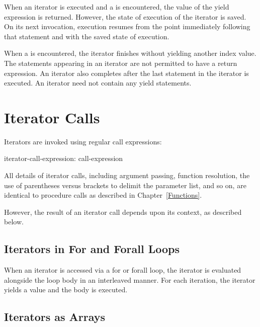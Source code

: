 When an iterator is executed and a  is encountered, the value of the yield
expression is returned.  However, the state of execution of the iterator is
saved.  On its next invocation, execution resumes from the point immediately
following that  statement and with the saved state of execution.

When a  is encountered, the iterator finishes without yielding another
index value.  The  statements appearing in an iterator are not
permitted to have a return expression.
An iterator also completes after the last
statement in the iterator is executed.
An iterator need not contain any yield statements.

\section{Iterator Calls}
\label{Iterator_Calls}

Iterators are invoked using regular call expressions:
\begin{syntax}
iterator-call-expression:
  call-expression
\end{syntax}

All details of iterator calls, including argument passing, function
resolution, the use of parentheses versus brackets to delimit the parameter
list, and so on,
are identical to procedure calls as described in Chapter~\ref{Functions}.

However, the result of an iterator call depends upon its context, as described below.

\subsection{Iterators in For and Forall Loops}
\label{Iterators_in_For_and_Forall_Loops}

When an iterator is accessed via a for or forall loop, the iterator is
evaluated alongside the loop body in an interleaved manner.  For each
iteration, the iterator yields a value and the body is executed.

\subsection{Iterators as Arrays}
\label{Iterators_as_Arrays}

